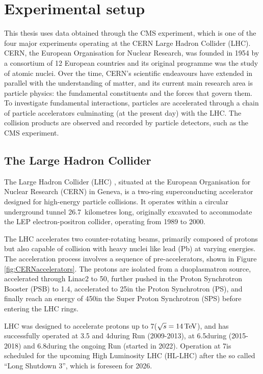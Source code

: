 \chapter{Experimental setup}
This thesis uses data obtained through the CMS experiment, which is one of the four major experiments operating at the CERN Large Hadron Collider (LHC).
CERN, the European Organisation for Nuclear Research, was founded in 1954 by a consortium of 12 European countries and its original programme was the study of atomic nuclei.
Over the time, CERN's scientific endeavours have extended in parallel with the understanding of matter, and its current main research area is particle physics: the fundamental constituents and the forces that govern them.
To investigate fundamental interactions, particles are accelerated through a chain of particle accelerators culminating (at the present day) with the LHC.
The collision products are observed and recorded by particle detectors, such as the CMS experiment.

\section{The Large Hadron Collider}
The Large Hadron Collider (LHC) \cite{CERN-AC-93-03-LHC}, situated at the European Organisation for Nuclear Research (CERN) in Geneva, is a two-ring superconducting accelerator designed for high-energy particle collisions.
It operates within a circular underground tunnel 26.7~kilometres long, originally excavated to accommodate the LEP electron-positron collider, operating from 1989 to 2000.

The LHC accelerates two counter-rotating beams, primarily composed of protons but also capable of collision with heavy nuclei like lead (Pb) at varying energies.
The acceleration process involves a sequence of pre-accelerators, shown in Figure \ref{fig:CERNaccelerators}.
The protons are isolated from a duoplasmatron source, accelerated through Linac2 to 50\MeV, further pushed in the Proton Synchrotron Booster (PSB) to 1.4\GeV, accelerated to 25\GeV in the Proton Synchrotron (PS), and finally reach an energy of 450\GeV in the Super Proton Synchrotron (SPS) before entering the LHC rings.

LHC was designed to accelerate protons up to 7\TeV ($\sqrt{s} = 14\,\text{Te\hspace{-.08em}V}$), and has successfully operated at 3.5 and 4\TeV during Run (2009-2013), at 6.5\TeV during \RunII (2015-2018) and 6.8\TeV during the ongoing Run (started in 2022).
Operation at 7\TeV is scheduled for the upcoming High Luminosity LHC (HL-LHC) after the so called ``Long Shutdown 3'', which is foreseen for 2026.

